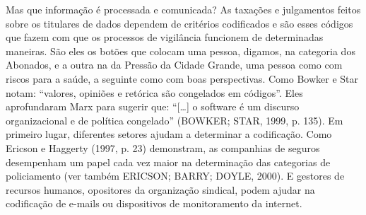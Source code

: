 Mas que informação é processada e comunicada? As taxações e julgamentos
feitos sobre os titulares de dados dependem de critérios codificados e
são esses códigos que fazem com que os processos de vigilância funcionem
de determinadas maneiras. São eles os botões que colocam uma pessoa,
digamos, na categoria dos Abonados, e a outra na da Pressão da Cidade
Grande, uma pessoa como com riscos para a saúde, a seguinte como com
boas perspectivas. Como Bowker e Star notam: ``valores, opiniões e
retórica são congelados em códigos''. Eles aprofundaram Marx para
sugerir que: ``{[}\ldots{}{]} o software é um discurso organizacional e
de política congelado'' (BOWKER; STAR, 1999, p. 135). Em primeiro lugar,
diferentes setores ajudam a determinar a codificação. Como Ericson e
Haggerty (1997, p. 23) demonstram, as companhias de seguros desempenham
um papel cada vez maior na determinação das categorias de policiamento
(ver também ERICSON; BARRY; DOYLE, 2000). E gestores de recursos
humanos, opositores da organização sindical, podem ajudar na codificação
de e-mails ou dispositivos de monitoramento da internet.

